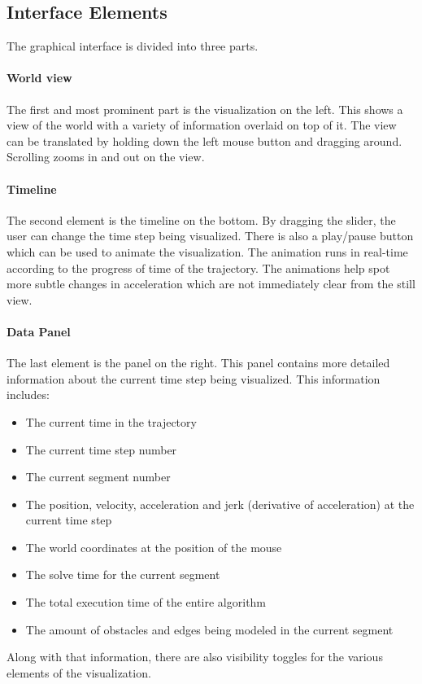 \subsection{Interface Elements}
The graphical interface is divided into three parts.

\paragraph{World view}The first and most prominent part is the visualization on the left. This shows a view of the world with a variety of information overlaid on top of it. The view can be translated by holding down the left mouse button and dragging around. Scrolling zooms in and out on the view.

\paragraph{Timeline}The second element is the timeline on the bottom. By dragging the slider, the user can change the time step being visualized. There is also a play/pause button which can be used to animate the visualization. The animation runs in real-time according to the progress of time of the trajectory. The animations help spot more subtle changes in acceleration which are not immediately clear from the still view.

\paragraph{Data Panel} The last element is the panel on the right. This panel contains more detailed information about the current time step being visualized. This information includes:
\begin{itemize}
\item The current time in the trajectory
\item The current time step number
\item The current segment number
\item The position, velocity, acceleration and jerk (derivative of acceleration) at the current time step
\item The world coordinates at the position of the mouse
\item The solve time for the current segment
\item The total execution time of the entire algorithm
\item The amount of obstacles and edges being modeled in the current segment
\end{itemize}
Along with that information, there are also visibility toggles for the various elements of the visualization.

